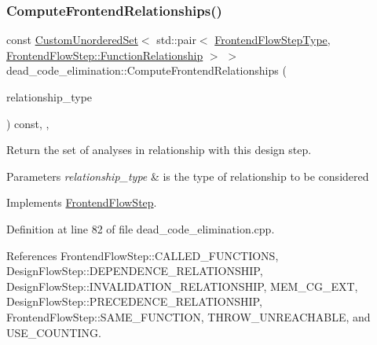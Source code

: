 \subsubsection{\texorpdfstring{Compute\+Frontend\+Relationships()}{ComputeFrontendRelationships()}}
{\footnotesize\ttfamily const \hyperlink{classCustomUnorderedSet}{Custom\+Unordered\+Set}$<$ std\+::pair$<$ \hyperlink{frontend__flow__step_8hpp_afeb3716c693d2b2e4ed3e6d04c3b63bb}{Frontend\+Flow\+Step\+Type}, \hyperlink{classFrontendFlowStep_af7cf30f2023e5b99e637dc2058289ab0}{Frontend\+Flow\+Step\+::\+Function\+Relationship} $>$ $>$ dead\+\_\+code\+\_\+elimination\+::\+Compute\+Frontend\+Relationships (\begin{DoxyParamCaption}\item[{const \hyperlink{classDesignFlowStep_a723a3baf19ff2ceb77bc13e099d0b1b7}{Design\+Flow\+Step\+::\+Relationship\+Type}}]{relationship\+\_\+type }\end{DoxyParamCaption}) const\hspace{0.3cm}{\ttfamily [override]}, {\ttfamily [private]}, {\ttfamily [virtual]}}



Return the set of analyses in relationship with this design step. 


\begin{DoxyParams}{Parameters}
{\em relationship\+\_\+type} & is the type of relationship to be considered \\
\hline
\end{DoxyParams}


Implements \hyperlink{classFrontendFlowStep_abeaff70b59734e462d347ed343dd700d}{Frontend\+Flow\+Step}.



Definition at line 82 of file dead\+\_\+code\+\_\+elimination.\+cpp.



References Frontend\+Flow\+Step\+::\+C\+A\+L\+L\+E\+D\+\_\+\+F\+U\+N\+C\+T\+I\+O\+NS, Design\+Flow\+Step\+::\+D\+E\+P\+E\+N\+D\+E\+N\+C\+E\+\_\+\+R\+E\+L\+A\+T\+I\+O\+N\+S\+H\+IP, Design\+Flow\+Step\+::\+I\+N\+V\+A\+L\+I\+D\+A\+T\+I\+O\+N\+\_\+\+R\+E\+L\+A\+T\+I\+O\+N\+S\+H\+IP, M\+E\+M\+\_\+\+C\+G\+\_\+\+E\+XT, Design\+Flow\+Step\+::\+P\+R\+E\+C\+E\+D\+E\+N\+C\+E\+\_\+\+R\+E\+L\+A\+T\+I\+O\+N\+S\+H\+IP, Frontend\+Flow\+Step\+::\+S\+A\+M\+E\+\_\+\+F\+U\+N\+C\+T\+I\+ON, T\+H\+R\+O\+W\+\_\+\+U\+N\+R\+E\+A\+C\+H\+A\+B\+LE, and U\+S\+E\+\_\+\+C\+O\+U\+N\+T\+I\+NG.

\mbox{\label{classdead__code__elimination_aa7771fdf8a82f2e274bf0cfe44edf553}} 
